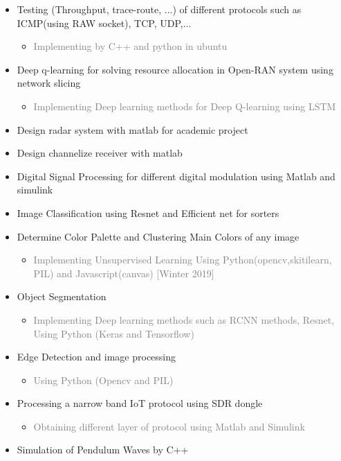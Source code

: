 \documentclass[10pt,a4paper,sans]{moderncv} %
\begin{document}
\begin{itemize}
 \item Testing (Throughput, trace-route, ...) of different protocols such as ICMP(using RAW socket), TCP, UDP,... 
 \begin{itemize}
     \item \textcolor{gray} {Implementing by C++ and python in ubuntu}
 \end{itemize}
\item Deep q-learning for solving resource allocation in Open-RAN system using network slicing
\begin{itemize}
\item \textcolor{gray}{Implementing Deep learning methods for Deep Q-learning using LSTM}
\end{itemize}
\item Design radar system with matlab for academic project
\item Design channelize receiver with matlab 
\item Digital Signal Processing for different digital modulation using Matlab and simulink 
\item Image Classification using Resnet and Efficient net for sorters
\item Determine Color Palette and Clustering Main Colors of any image
\begin{itemize}
\item \textcolor{gray}{Implementing Unsupervised Learning Using Python(opencv,skitilearn, PIL) and Javascript(canvas) [Winter 2019]}
\end{itemize}
\item Object Segmentation 
\begin{itemize}
\item \textcolor{gray}{Implementing Deep learning methods such as RCNN methods, Resnet, Using Python (Keras and Tensorflow) }
\end{itemize}
\item Edge Detection and image processing
\begin{itemize}
\item \textcolor{gray}{Using Python (Opencv and PIL)}
\end{itemize}
\item Processing a narrow band IoT protocol using SDR dongle \begin{itemize}
\item \textcolor{gray}{Obtaining different layer of protocol using Matlab and Simulink}
\end{itemize}
\item Simulation of Pendulum Waves by C++

\end{itemize}
\end{document}
